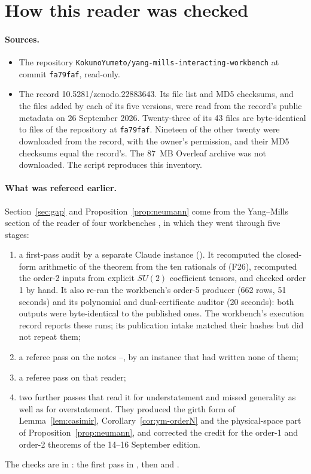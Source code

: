 \section{How this reader was checked}\label{app:verification}

\paragraph{Sources.}
\begin{itemize}
\item The repository \texttt{KokunoYumeto/yang-mills-interacting-workbench} at commit \texttt{fa79faf}, read-only.
\item The record 10.5281/zenodo.22883643. Its file list and MD5 checksums, and the files added by each of its five versions, were read from the record's public metadata on 26 September 2026. Twenty-three of its 43 files are byte-identical to files of the repository at \texttt{fa79faf}. Nineteen of the other twenty were downloaded from the record, with the owner's permission, and their MD5 checksums equal the record's. The 87~MB Overleaf archive was not downloaded. The script  reproduces this inventory.
\end{itemize}

\paragraph{What was refereed earlier.}
Section~\ref{sec:gap} and Proposition~\ref{prop:neumann} come from the Yang--Mills section of the reader of four workbenches \cite{WorkbenchReader}, in which they went through five stages:
\begin{enumerate}[label=\arabic*.]
\item a first-pass audit by a separate Claude instance (). It recomputed the closed-form arithmetic of the theorem from the ten rationals of (F26), recomputed the order-2 inputs from explicit $SU(2)$ coefficient tensors, and checked order 1 by hand. It also re-ran the workbench's order-5 producer (662 rows, 51 seconds) and its polynomial and dual-certificate auditor (20 seconds): both outputs were byte-identical to the published ones. The workbench's execution record reports these runs; its publication intake matched their hashes but did not repeat them;
\item a referee pass on the notes --, by an instance that had written none of them;
\item a referee pass on that reader;
\item two further passes that read it for understatement and missed generality as well as for overstatement. They produced the girth form of Lemma~\ref{lem:casimir}, Corollary~\ref{cor:ym-orderN} and the physical-space part of Proposition~\ref{prop:neumann}, and corrected the credit for the order-1 and order-2 theorems of the 14--16 September edition.
\end{enumerate}
The checks are in : the first pass in , then  and .

